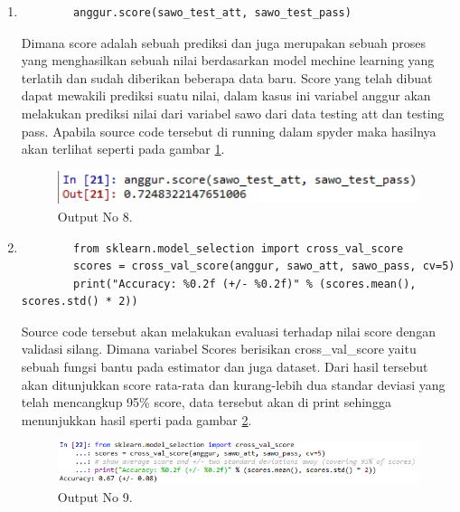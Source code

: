 \begin{enumerate}
		\item
	\begin{verbatim}
		anggur.score(sawo_test_att, sawo_test_pass)
	\end{verbatim}
	\subitem Dimana score adalah sebuah prediksi dan juga merupakan sebuah proses yang menghasilkan sebuah nilai berdasarkan 		model mechine learning yang terlatih dan sudah diberikan beberapa data baru. Score yang telah dibuat dapat mewakili prediksi 		suatu nilai, dalam kasus ini variabel anggur akan melakukan prediksi nilai dari variabel sawo dari data testing att dan testing pass. 		Apabila source code tersebut di running dalam spyder maka hasilnya akan terlihat seperti pada gambar \ref{YNO8}.

	\begin{figure}[ht]
		\centerline{\includegraphics[width=1\textwidth]{figures/YN/YNBerhasil8.png}}
		\caption{Output No 8.}
		\label{YNO8}
	\end{figure}

		\item
	\begin{verbatim}
		from sklearn.model_selection import cross_val_score
		scores = cross_val_score(anggur, sawo_att, sawo_pass, cv=5)
		print("Accuracy: %0.2f (+/- %0.2f)" % (scores.mean(), scores.std() * 2))
	\end{verbatim}
	\subitem Source code tersebut akan melakukan evaluasi terhadap nilai score dengan validasi silang. Dimana variabel Scores 				    berisikan cross\_val\_score yaitu sebuah fungsi bantu pada estimator dan juga dataset. Dari hasil tersebut akan 				    ditunjukkan score rata-rata dan kurang-lebih dua standar deviasi yang telah mencangkup 95\% score, data tersebut 				    akan di print sehingga menunjukkan hasil sperti pada gambar \ref{YNO9}.

	\begin{figure}[ht]
		\centerline{\includegraphics[width=1\textwidth]{figures/YN/YNBerhasil9.png}}
		\caption{Output No 9.}
		\label{YNO9}
	\end{figure}


\end{enumerate}
